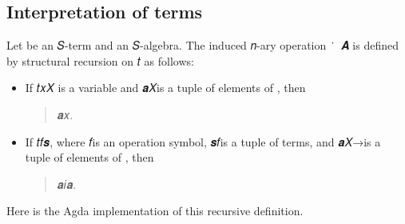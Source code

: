 \documentclass[a4paper,USenglish,cleveref,autoref,thm-restate]{lipics-v2019}
\begin{document}
\subsection{Interpretation of terms}\label{sec:interpretation-of-terms}
Let  be an 𝑆-term and  an 𝑆-algebra. The induced 𝑛-ary operation \ ̇\ 𝑨 is defined by structural recursion on 𝑡 as follows:
\begin{itemize}
\item If \AB 𝑡\AS\AgdaSymbol{=}\AS\AB 𝑥\AS{}\AS\AB 𝑋 is a variable and \AB 𝒂\AS\AgdaSymbol{:}\AS\AB 𝑋\AS{}\AS\univA is a tuple of elements of \univA, then
\begin{quote}
  \tA\AgdaSpace{}\AgdaSpace{}\AgdaSymbol{=}\AS\AB 𝒂\AS\AB 𝑥.
\end{quote}
\item If \AB 𝑡\AS\AgdaSymbol{=}\AS\AB 𝑓\AS\AB 𝒔, where \AB 𝑓\AS{}\AS\univS is an operation symbol, \AB 𝒔\AS\AgdaSymbol{:}\AS\arityS\AS\AB 𝑓\AS{}\AS\AB \TX is a tuple of terms, and \AB 𝒂\AS\AgdaSymbol{:}\AS\AB 𝑋\ASy →\AS\univA is a tuple of elements of \univA, then
  \begin{quote}
    \tA\AgdaSpace{}\AgdaSpace{}\AgdaSymbol{=}\AS\fsA\AS\AB 𝒂\AS\ASy{=}\AS\fA{}\AS\AB 𝑖\AS{}\AS\siA\AS\AB 𝒂\AgdaSymbol{)}.
    \end{quote}
\end{itemize}
Here is the Agda implementation of this recursive definition.
\begin{code}\end{code}


\begin{comment}
  Next we show that if 𝑝 : 𝑇(𝑋) is a term, then there exists 𝓅 : 𝑇(𝑋) and 𝒕 : 𝑋 → 𝑇(𝑋) such that 𝑝 ≡ (𝓅\ ̇\ 𝑻(𝑋))\ 𝒕. We prove this fact in the following module:
  \begin{code}\end{code}
  Next we have some definitions that are sometimes useful when dealing with the interpretations of terms in a product structure.
  \begin{code}\end{code}
  \subsection{Compatibility of terms}\label{sec:compatibility-of-terms}
  Here we present the formal proof of the fact that homomorphisms and terms are compatible.  That is, if 𝑨 and 𝑩 are 𝑆-algebras, h : 𝑨 → 𝑩 a homomorphism, and 𝑡 a term in the language of 𝑆, then for all a : X → ∣ 𝑨 ∣ we have \(h (t^{𝑨} a) = t^{𝑩} (h ∘ a)\).
\end{comment}
\end{document}
